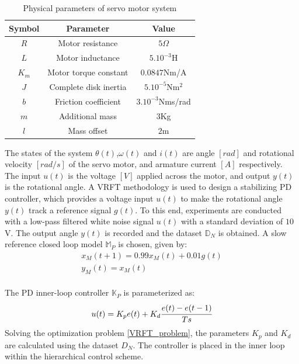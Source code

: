 \documentclass[letterpaper, 10 pt, conference]{ieeeconf}  %
\begin{document}
\begin{enumerate}
	\begin{table}[h!]
		\hspace{30pt}
		\begin{tabular}{||c|c|c||} 
			\hline
			Symbol & Parameter & Value\\ [0.5ex] 
			\hline\hline
			$R$ & Motor resistance & $5\Omega$ \\ 
			$L$ & Motor inductance & $5.10^{-3}$H \\
			$K_m$ & Motor torque constant & $0.0847$Nm/A \\
			$J$ & Complete disk inertia & $5.10^{-5}$Nm$^2$ \\
			$b$ & Friction coefficient & $3.10^{-3}$Nms/rad \\
			$m$ & Additional mass & $3$Kg \\
			$l$ & Mass offset & $2$m \\
			\hline
		\end{tabular}
		\caption{Physical parameters of servo motor system}
		\label{Simparam}
	\end{table}
	The states of the system $\theta(t)$,$\omega(t)$ and $i(t)$ are angle $[rad]$ and rotational velocity $[rad/s]$ of the servo motor, and armature current $[A]$ respectively. The input $u(t)$ is the voltage $[V]$ applied across the motor, and output $y(t)$ is the rotational angle. 
	A VRFT methodology is used to design a stabilizing PD controller, which provides a voltage input $u(t)$ to make the rotational angle $y(t)$ track a reference signal $g(t)$. To this end, experiments are conducted with a low-pass filtered white noise signal $u(t)$ with a standard deviation of $10$V. The output angle $y(t)$ is recorded and the dataset $\mathbb{D}_N$ is obtained. A slow reference closed loop model $\mathbb{M}_P$ is chosen, given by:
	\begin{equation*}
	\begin{matrix}
	x_M(t+1) = 0.99x_M(t) + 0.01g(t)\\
	y_M(t) = x_M(t)
	\end{matrix}
	\end{equation*}\\ 
	The PD inner-loop controller $\mathbb{K}_P$ is parameterized as:
	\begin{equation*}
	u(t) = K_pe(t) + K_d\cfrac{e(t)-e(t-1)}{Ts}
	\end{equation*} 
	Solving the optimization problem \eqref{VRFT_problem}, the parameters 
	$K_p$ and $K_d$ are calculated using the dataset $D_N$. The controller is placed in the inner loop within the hierarchical control scheme.

\end{enumerate}
\end{document}
